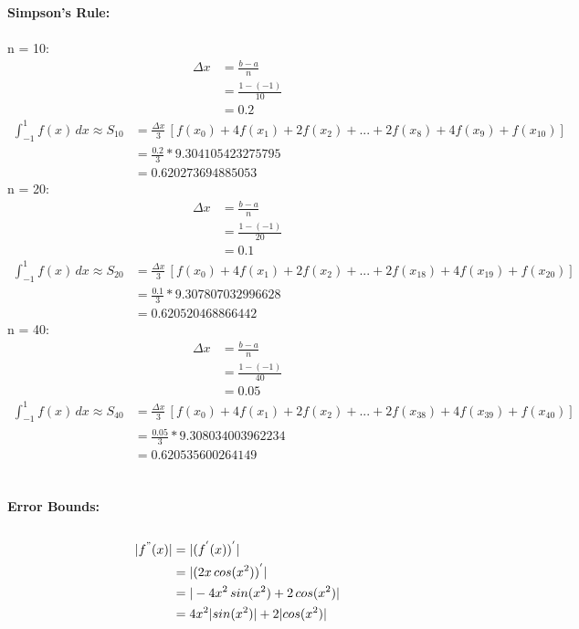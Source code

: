 \documentclass{article}
\begin{document}
    \textbf{Simpson's Rule:}\\\\
    n = 10:\\
    \begin{align*}
        \Delta x &= \frac{b-a}{n}\\
        &= \frac{1-(-1)}{10}\\
        &= 0.2
    \end{align*}
    \begin{align*}
        \int_{-1}^{1} f(x) \, dx \approx S_{10} &= \frac{\Delta x}{3} \, [f(x_0)+4f(x_1)+2f(x_2)+...+2f(x_8)+4f(x_9)+f(x_{10})] \\
        &= \frac{0.2}{3} * 9.304105423275795 \\
        &= 0.620273694885053
    \end{align*}
    n = 20:\\
    \begin{align*}
        \Delta x &= \frac{b-a}{n}\\
        &= \frac{1-(-1)}{20}\\
        &= 0.1
    \end{align*}
    \begin{align*}
        \int_{-1}^{1} f(x) \, dx \approx S_{20} &= \frac{\Delta x}{3} \, [f(x_0)+4f(x_1)+2f(x_2)+...+2f(x_{18})+4f(x_{19})+f(x_{20})] \\
        &= \frac{0.1}{3} * 9.307807032996628 \\
        &= 0.620520468866442
    \end{align*}
    n = 40:\\
    \begin{align*}
        \Delta x &= \frac{b-a}{n}\\
        &= \frac{1-(-1)}{40}\\
        &= 0.05
    \end{align*}
    \begin{align*}
        \int_{-1}^{1} f(x) \, dx \approx S_{40} &= \frac{\Delta x}{3} \, [f(x_0)+4f(x_1)+2f(x_2)+...+2f(x_{38})+4f(x_{39})+f(x_{40})] \\
        &= \frac{0.05}{3} * 9.308034003962234\\
        &= 0.620535600264149
    \end{align*} \\\\
    
    \textbf{Error Bounds:} \\\\
    \begin{align*}
       |f^{"}(x)| &= |(f^{'}(x))^{'}| \\
        &= |(2x \, cos(x^2))^{'}| \\
        &= |-4x^2\,sin(x^2)+2\,cos(x^2)| \\
        &= 4x^2|sin(x^2)| + 2|cos(x^2)|
    \end{align*}
\end{document}
